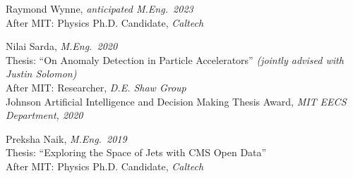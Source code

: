 \bbl

\item Raymond Wynne, \emph{anticipated M.Eng.~2023}
\\ \sh After MIT: Physics Ph.D. Candidate, \emph{Caltech}

\item Nilai Sarda, \emph{M.Eng.~2020}
\\ \sh Thesis: ``On Anomaly Detection in Particle Accelerators'' \emph{(jointly advised with Justin Solomon)}
\\ \sh After MIT: Researcher, \emph{D.E. Shaw Group}
\\ \sh Johnson Artificial Intelligence and Decision Making Thesis Award, \emph{MIT EECS Department, 2020}

\item Preksha Naik, \emph{M.Eng.~2019}
\\ \sh Thesis: ``Exploring the Space of Jets with CMS Open Data''
\\ \sh After MIT: Physics Ph.D. Candidate, \emph{Caltech}

\el
